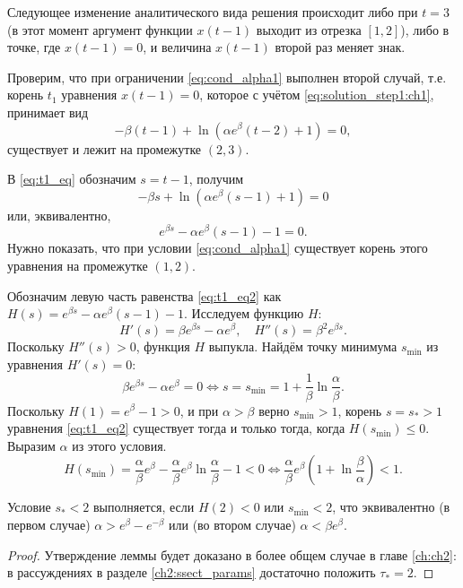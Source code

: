 Следующее изменение аналитического вида решения происходит либо при $t = 3$ (в этот момент аргумент функции $x(t - 1)$ выходит из отрезка $[1, 2]$), либо в точке, где $x(t - 1) = 0$, и величина $x(t - 1)$ второй раз меняет знак.

Проверим, что при ограничении \eqref{eq:cond_alpha1} выполнен второй случай, т.е. корень $t_1$ уравнения $x(t - 1) = 0$, которое с учётом \eqref{eq:solution_step1:ch1}, принимает вид
\begin{equation}
\label{eq:t1_eq}
    -\beta (t - 1) + \ln(\alpha e^{\beta}(t - 2) + 1) = 0,
\end{equation}
существует и лежит на промежутке $(2, 3)$.

В \eqref{eq:t1_eq} обозначим $s = t - 1$, получим
%
$$-\beta s + \ln(\alpha e^{\beta} (s - 1) + 1) = 0$$
%
или, эквивалентно,
%
\begin{equation}
\label{eq:t1_eq2}
e^{\beta s} - \alpha e^{\beta} (s - 1) - 1 = 0.
\end{equation}
Нужно показать, что при условии \eqref{eq:cond_alpha1} существует корень этого уравнения на промежутке $(1, 2)$.

Обозначим левую часть равенства \eqref{eq:t1_eq2} как $H(s) = e^{\beta s} - \alpha e^{\beta} (s - 1) - 1$. Исследуем функцию $H$:
%
\[
H'(s) = \beta e^{\beta s} - \alpha e^{\beta}, \quad H''(s) = \beta^2 e^{\beta s}.
\]
%
Поскольку $H''(s) > 0$, функция $H$ выпукла. Найдём точку минимума $s_{\min}$ из уравнения $H'(s) = 0$:
\[
\beta e^{\beta s} - \alpha e^{\beta} = 0 \Leftrightarrow s = s_{\min} = 1 + \frac{1}{\beta}\ln\frac{\alpha}{\beta}.
\]
%
Поскольку $H(1) = e^{\beta} - 1 > 0$, и при $\alpha > \beta$ верно $s_{\min} > 1$, корень $s = s_* > 1$ уравнения \eqref{eq:t1_eq2} существует тогда и только тогда, когда $H(s_{\min}) \leqslant 0$. Выразим $\alpha$ из этого условия.
%
\[
H(s_{\min}) = \frac{\alpha}{\beta}e^{\beta} - \frac{\alpha}{\beta}e^\beta\ln\frac{\alpha}{\beta} - 1 < 0 \Leftrightarrow \frac{\alpha}{\beta}e^{\beta}\left(1 + \ln\frac{\beta}{\alpha}\right) < 1.
\]

Условие $s_* < 2$ выполняется, если $H(2) < 0$ или $s_{\min} < 2$, что эквивалентно (в первом случае) $\alpha > e^{\beta} - e^{-\beta}$ или (во втором случае) $\alpha < \beta e^{\beta}$.

\begin{proof}
	Утверждение леммы будет доказано в более общем случае в главе \ref{ch:ch2}: в рассуждениях в разделе \ref{ch2:ssect_params} достаточно положить $\tau_* = 2$.
\end{proof}

